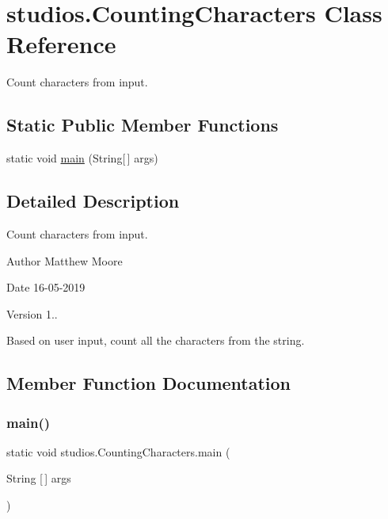 \hypertarget{classstudios_1_1_counting_characters}{}\section{studios.\+Counting\+Characters Class Reference}
\label{classstudios_1_1_counting_characters}


Count characters from input.  


\subsection*{Static Public Member Functions}
\begin{DoxyCompactItemize}
\item 
static void \mbox{\hyperlink{classstudios_1_1_counting_characters_a20db7f61ae28debf8b27d095f35250cb}{main}} (String\mbox{[}$\,$\mbox{]} args)
\end{DoxyCompactItemize}


\subsection{Detailed Description}
Count characters from input. 

\begin{DoxyAuthor}{Author}
Matthew Moore 
\end{DoxyAuthor}
\begin{DoxyDate}{Date}
16-\/05-\/2019 
\end{DoxyDate}
\begin{DoxyVersion}{Version}
1..
\end{DoxyVersion}
Based on user input, count all the characters from the string. 

\subsection{Member Function Documentation}
\mbox{\label{classstudios_1_1_counting_characters_a20db7f61ae28debf8b27d095f35250cb}} 
\subsubsection{\texorpdfstring{main()}{main()}}
{\footnotesize\ttfamily static void studios.\+Counting\+Characters.\+main (\begin{DoxyParamCaption}\item[{String \mbox{[}$\,$\mbox{]}}]{args }\end{DoxyParamCaption})\hspace{0.3cm}{\ttfamily [static]}}


